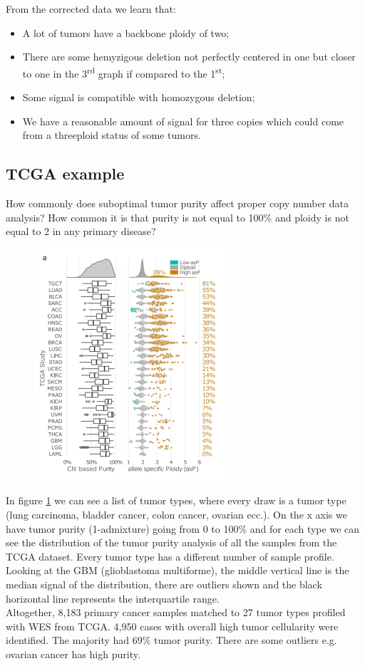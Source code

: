 From the corrected data we learn that:

\begin{itemize}
\item
  A lot of tumors have a backbone ploidy of two;
\item
  There are some hemyzigous deletion not perfectly centered in one but closer to one in the 3\textsuperscript{rd} graph if compared to the 1\textsuperscript{st};
\item
  Some signal is compatible with homozygous deletion;
\item
  We have a reasonable amount of signal for three copies which could come from a threeploid status of some tumors.
\end{itemize}

\subsection{TCGA example}
How commonly does suboptimal tumor purity affect proper copy number data analysis? How common it is that purity is not equal to 100\% and ploidy is not equal to 2 in any primary disease?

\begin{figure}[H]
\centering
\includegraphics[width=0.5\linewidth]{image9.png}
\caption{}
\label{fig:tcga}
\end{figure}

In figure \ref{fig:tcga} we can see a list of tumor types, where every draw is a tumor type (lung carcinoma, bladder cancer, colon cancer, ovarian ecc.). On the x axis we have tumor purity (1-admixture) going from 0 to 100\% and for each type we can see the distribution of the tumor purity analysis of all the samples from the TCGA dataset. Every tumor type has a different number of sample profile.
\\
Looking at the GBM (glioblastoma multiforme), the middle vertical line is the median signal of the distribution, there are outliers shown and the black horizontal line represents the interquartile range.
\\
Altogether, 8,183 primary cancer samples matched to 27 tumor types profiled with WES from TCGA. 4,950 cases with overall high tumor cellularity were identified. The majority had 69\% tumor purity. There are some outliers e.g. ovarian cancer has high purity.

